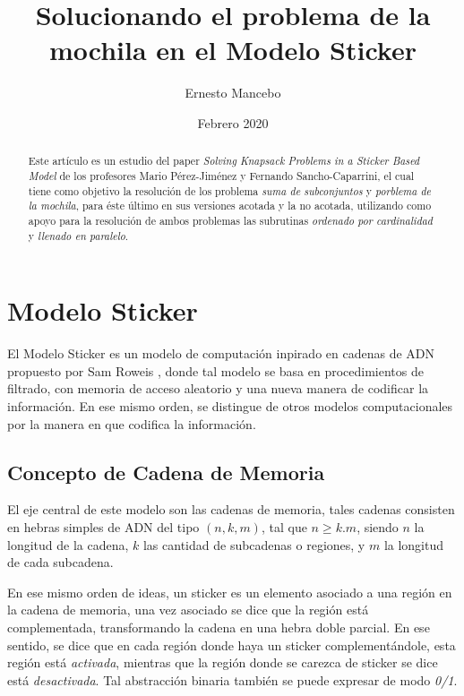 \documentclass[12pt, letterpaper, twoside]{article}
\title{Solucionando el problema de la mochila en el Modelo Sticker}
\author{Ernesto Mancebo}
\date{Febrero 2020}
\begin{document}
    \maketitle
    \begin{abstract}
        Este artículo es un estudio del paper \emph{Solving Knapsack Problems in a Sticker Based Model} de los profesores Mario P{\'e}rez-Jim{\'e}nez y Fernando Sancho-Caparrini\autocite{ref10.1007/3-540-48017-X_15}, el cual tiene como objetivo la resolución de los problema \emph{suma de subconjuntos} y \emph{porblema de la mochila}, para éste último en sus versiones acotada y la no acotada, utilizando como apoyo para la resolución de ambos problemas las subrutinas \emph{ordenado por cardinalidad} y \emph{llenado en paralelo}.
    \end{abstract}

    \newpage
    \tableofcontents

    \newpage
    \section{Modelo Sticker}
    El Modelo Sticker es un modelo de computación inpirado en cadenas de ADN propuesto por Sam Roweis \autocite{sticker_model}, donde tal modelo se basa en procedimientos de filtrado, con memoria de acceso aleatorio y una nueva manera de codificar la información. En ese mismo orden, se distingue de otros modelos computacionales por la manera en que codifica la información.

    \subsection{Concepto de Cadena de Memoria}
    El eje central de este modelo son las cadenas de memoria, tales cadenas consisten en hebras simples de ADN del tipo $(n, k, m)$, tal que $n\geq k.m$, siendo $n$ la longitud de la cadena, $k$ las cantidad de subcadenas o regiones, y $m$ la longitud de cada subcadena.

    En ese mismo orden de ideas, un sticker es un elemento asociado a una región en la cadena de memoria, una vez asociado se dice que la región está complementada, transformando la cadena en una hebra doble parcial. En ese sentido, se dice que en cada región donde haya un sticker complementándole, esta región está \emph{activada}, mientras que la región donde se carezca de sticker se dice está \emph{desactivada}. Tal abstracción binaria también se puede expresar de modo \emph{0/1}.
\end{document}

